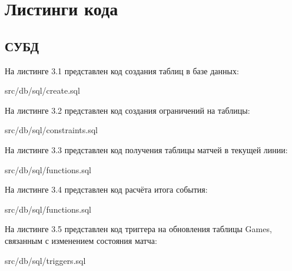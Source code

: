 \section{Листинги кода}

\subsection{СУБД}
На листинге 3.1 представлен код создания таблиц в базе данных:

\FloatBarrier
\begin{lstinputlisting}[language=SQL, caption=Создание таблиц в БД, 
	basicstyle=\footnotesize\ttfamily, frame=single,breaklines=true]{src/db/sql/create.sql}
\end{lstinputlisting}
\FloatBarrier

На листинге 3.2 представлен код создания ограничений на таблицы:
\FloatBarrier
\begin{lstinputlisting}[language=SQL, caption=Создание ограничений на таблицы, 
	basicstyle=\footnotesize\ttfamily, frame=single,breaklines=true]{src/db/sql/constraints.sql}
\end{lstinputlisting}
\FloatBarrier

\newpage

На листинге 3.3 представлен код получения таблицы матчей в текущей линии:
\FloatBarrier
\begin{lstinputlisting}[language=SQL, caption=Получение таблицы матчей в текущей линии, linerange = {78-101},
	basicstyle=\footnotesize\ttfamily, frame=single, breaklines=true]{src/db/sql/functions.sql}
\end{lstinputlisting}
\FloatBarrier


На листинге 3.4 представлен код расчёта итога события:
\FloatBarrier
\begin{lstinputlisting}[language=SQL, caption=Расчёт итога события, linerange = {127-151},
	basicstyle=\footnotesize\ttfamily, frame=single,breaklines=true]{src/db/sql/functions.sql}
\end{lstinputlisting}
\FloatBarrier

На листинге 3.5 представлен код триггера на обновления таблицы Games, связанным с изменением состояния матча:
\FloatBarrier
\begin{lstinputlisting}[language=SQL, caption=Триггер на обновление таблицы Games, linerange = {23-50},
	basicstyle=\footnotesize\ttfamily, frame=single,breaklines=true]{src/db/sql/triggers.sql}
\end{lstinputlisting}
\FloatBarrier

